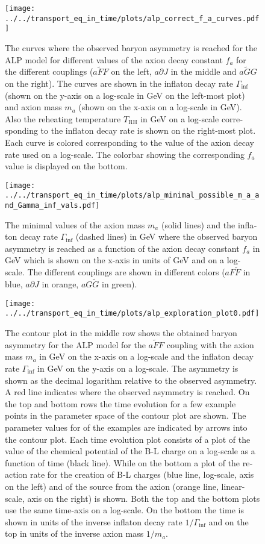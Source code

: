 \documentclass[master,       %
               twoside,        %
               BCOR10mm,       %
               english,ngerman, %
               ]{GAUBM}
\begin{document}
\begin{otherlanguage}{english}
\begin{figure}[h]
    \texttt{[image: ../../transport\_eq\_in\_time/plots/alp\_correct\_f\_a\_curves.pdf]}
    \caption{The curves where the observed baryon asymmetry is reached for the ALP model for different values of the axion decay constant $f_a$ for the different couplings ($a \tilde{F} F$ on the left, $a \partial J$ in the middle and $a \tilde{G} G$ on the right). The curves are shown in the inflaton decay rate $\Gamma_\mathrm{inf}$ (shown on the y-axis on a log-scale in GeV on the left-most plot) and axion mass $m_a$ (shown on the x-axis on a log-scale in GeV). Also the reheating temperature $T_{\mathrm{RH}}$ in GeV on a log-scale corresponding to the inflaton decay rate is shown on the right-most plot.
    Each curve is colored corresponding to the value of the axion decay rate used on a log-scale. The colorbar showing the corresponding $f_a$ value is displayed on the bottom.}
\end{figure}

\begin{figure}[h]
	\texttt{[image: ../../transport\_eq\_in\_time/plots/alp\_minimal\_possible\_m\_a\_and\_Gamma\_inf\_vals.pdf]}
	\caption{The minimal values of the axion mass $m_a$ (solid lines) and the inflaton decay rate  $\Gamma_\mathrm{inf}$ (dashed lines) in GeV where the observed baryon asymmetry is reached as a function of the axion decay constant $f_a$ in GeV which is shown on the x-axis in units of GeV and on a log-scale. The different couplings are shown in different colors ($a F \tilde{F}$ in blue, $a \partial J$ in orange, $a G \tilde{G}$ in green).}
\end{figure}

\begin{figure}[h]
    \texttt{[image: ../../transport\_eq\_in\_time/plots/alp\_exploration\_plot0.pdf]}
    \caption{The contour plot in the middle row shows the obtained baryon asymmetry for the ALP model for the $a \tilde{F} F$ coupling with the axion mass $m_a$ in GeV on the x-axis on a log-scale and the inflaton decay rate $\Gamma_\mathrm{inf}$ in GeV on the y-axis on a log-scale. The asymmetry is shown as the decimal logarithm relative to the observed asymmetry. A red line indicates where the observed asymmetry is reached. On the top and bottom rows the time evolution for a few example points in the parameter space of the contour plot are shown. The parameter values for of the examples are indicated by arrows into the contour plot. Each time evolution plot consists of a plot of the value of the chemical potential of the B-L charge on a log-scale as a function of time (black line). While on the bottom a plot of the reaction rate for the creation of B-L charges (blue line, log-scale, axis on the left) and of the source from the axion (orange line, linear-scale, axis on the right) is shown.
    	Both the top and the bottom plots use the same time-axis on a log-scale. On the bottom the time is shown in units of the inverse inflaton decay rate $1/\Gamma_\mathrm{inf}$ and on the top in units of the inverse axion mass $1/m_a$.}
    \label{fig:alp_explorations_plot_aFF}
\end{figure}


\end{otherlanguage}
\end{document}
